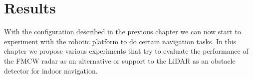 \chapter{Results}


With the configuration described in the previous chapter we can now start to experiment with the robotic platform to do certain navigation tasks. In this chapter we propose various experiments that try to evaluate the  performance of the \ac{FMCW} \ac{radar} as an alternative or support to the \ac{LiDAR} as an obstacle detector for indoor navigation.




